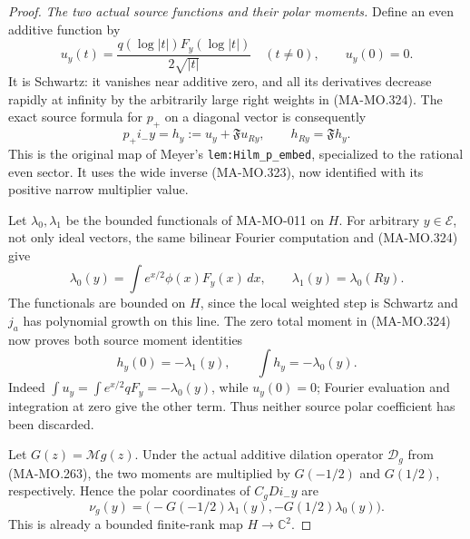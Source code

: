 \begin{proof}
\emph{The two actual source functions and their polar moments.}
Define an even additive function by
\[
 u_y(t)=\frac{q(\log|t|)F_y(\log|t|)}{2\sqrt{|t|}}
        \quad(t\ne0),\qquad u_y(0)=0.
 \tag{MA-MO.325}
\]
It is Schwartz: it vanishes near additive zero, and all
its derivatives decrease rapidly at infinity by the
arbitrarily large right weights in (MA-MO.324).
The exact source formula for \(p_+\) on a diagonal vector
is consequently
\[
        p_+i_-y=h_y:=u_y+\mathfrak F u_{Ry},
             \qquad h_{Ry}=\mathfrak F h_y.
 \tag{MA-MO.326}
\]
This is the original map of Meyer's
\texttt{lem:Hilm\_p\_embed}, specialized to the rational
even sector. It uses the wide inverse (MA-MO.323), now
identified with its positive narrow multiplier value.

Let \(\lambda_0,\lambda_1\) be the bounded functionals
of MA-MO-011 on \(H\). For arbitrary \(y\in\mathcal E\),
not only ideal vectors, the same bilinear Fourier computation
and (MA-MO.324) give
\[
 \lambda_0(y)=\int e^{x/2}\phi(x)F_y(x)\,dx,
                  \qquad\lambda_1(y)=\lambda_0(Ry).
 \tag{MA-MO.327}
\]
The functionals are bounded on \(H\), since the local
weighted step is Schwartz and \(j_a\) has polynomial
growth on this line. The zero total moment in (MA-MO.324)
now proves both source moment identities
\[
       h_y(0)=-\lambda_1(y),\qquad
       \int h_y=-\lambda_0(y).
 \tag{MA-MO.328}
\]
Indeed \(\int u_y=\int e^{x/2}qF_y=-\lambda_0(y)\),
while \(u_y(0)=0\); Fourier evaluation and integration
at zero give the other term. Thus neither source polar
coefficient has been discarded.

Let \(G(z)=\mathcal Mg(z)\). Under the actual additive
dilation operator \(\mathcal D_g\) from (MA-MO.263),
the two moments are multiplied by \(G(-1/2)\) and
\(G(1/2)\), respectively. Hence the polar coordinates
of \(C_gDi_-y\) are
\[
 \nu_g(y)=
       \bigl(-G(-1/2)\lambda_1(y),
             -G(1/2)\lambda_0(y)\bigr).
 \tag{MA-MO.329}
\]
This is already a bounded finite-rank map \(H\to\mathbb C^2\).


\end{proof}
